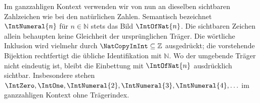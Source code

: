 Im ganzzahligen Kontext verwenden wir von nun an dieselben sichtbaren
Zahlzeichen wie bei den natürlichen Zahlen.  Semantisch bezeichnet
\(\IntNumeral{n}\) für \(n\in\mathbb N\) stets das Bild \(\IntOfNat{n}\).
Die sichtbaren Zeichen allein behaupten keine Gleichheit der ursprünglichen
Träger.  Die wörtliche Inklusion wird vielmehr durch
\(\NatCopyInInt\subseteq\mathbb Z\) ausgedrückt; die vorstehende Bijektion
rechtfertigt die übliche Identifikation mit \(\mathbb N\).  Wo der umgebende
Träger nicht eindeutig ist, bleibt die Einbettung mit \(\IntOfNat{n}\)
ausdrücklich sichtbar.
Insbesondere stehen \(\IntZero,\IntOne,\IntNumeral{2},\IntNumeral{3},
\IntNumeral{4},\ldots\) im ganzzahligen Kontext ohne Trägerindex.

\par{}
\hypertarget{integers.statement.IntegerNumeralConvention}{}

\par{}
\hypertarget{integers.statement.IntegerZeroDef}{}


\par{}
\hypertarget{integers.statement.IntegerOneDef}{}


\par{}
\hypertarget{integers.statement.IntegerZeroClass}{}

\par{}
\hypertarget{integers.proof.IntegerZeroClass}{}
\begin{tabproof}
\end{tabproof}

